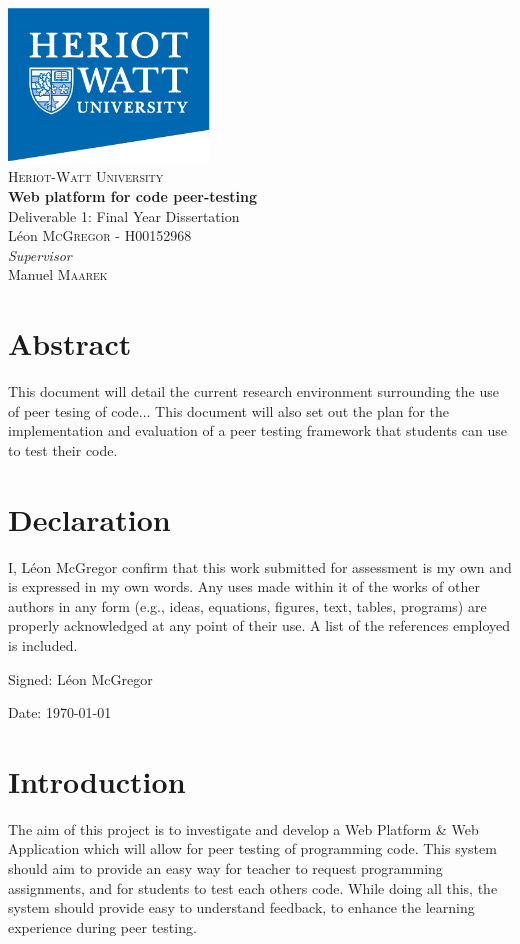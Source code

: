 \documentclass[a4paper,11pt]{report}
\newcommand{\titles}{\\\vspace{1cm}}
\begin{document}
{\centering\Large
\includegraphics[width=0.4\textwidth]{hwlogo}\titles
{\scshape\LARGE Heriot-Watt University\titles}
{\huge\bfseries Web platform for code peer-testing\titles}
Deliverable 1: Final Year Dissertation\titles
L\'eon \textsc{McGregor} - H00152968\titles
{\large\textit{Supervisor}\\}
Manuel \textsc{Maarek}\\
\vfill
}

\pagebreak

\tableofcontents


\pagebreak
\doublespacing


\section*{Abstract}
This document will detail the current research environment surrounding the use of peer tesing of code... This document will also set out the plan for the implementation and evaluation of a peer testing framework that students can use to test their code.

\vfill

\section*{Declaration}
I, L\'eon McGregor confirm that this work submitted for assessment is my own and is expressed in my own words. Any uses made within it of the works of other authors in any form (e.g., ideas, equations, figures, text, tables, programs) are properly acknowledged at any point of their use. A list of the references employed is included.\par
Signed: L\'eon McGregor\par
Date: \today

\pagebreak

\pagestyle{headings}




\section{Introduction}
The aim of this project is to investigate and develop a Web Platform \& Web Application which will allow for peer testing of programming code. This system should aim to provide an easy way for teacher to request programming assignments, and for students to test each others code. While doing all this, the system should provide easy to understand feedback, to enhance the learning experience during peer testing.\\
\end{document}

